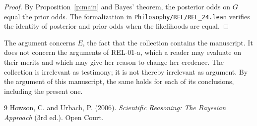 \documentclass{situationist-preprint}
\begin{document}
\begin{proof}
By Proposition~\ref{p:main} and Bayes' theorem, the posterior odds on $G$ equal the prior odds. The formalization in \nolinkurl{Philosophy/REL/REL_24.lean} verifies the identity of posterior and prior odds when the likelihoods are equal.
\end{proof}

\begin{remark}
The argument concerns $E$, the fact that the collection contains the manuscript. It does not concern the arguments of REL-01-a, which a reader may evaluate on their merits and which may give her reason to change her credence. The collection is irrelevant as testimony; it is not thereby irrelevant as argument. By the argument of this manuscript, the same holds for each of its conclusions, including the present one.
\end{remark}

\begin{thebibliography}{9}\small
{} Howson, C. and Urbach, P. (2006). \emph{Scientific Reasoning: The Bayesian Approach} (3rd ed.). Open Court.
\end{thebibliography}
\end{document}
